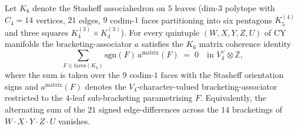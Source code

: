 \begin{theorem}
\label{thm:k6-5fold-matrix-coherence}
Let $K_6$ denote the Stasheff associahedron on $5$ leaves
\textup{(}dim-$3$ polytope with $C_4 = 14$ vertices, $21$ edges, $9$
codim-$1$ faces partitioning into six pentagons $K_5^{(4)}$ and three
squares $K_4^{(3)} \times K_4^{(3)}$\textup{).} For every quintuple
$(W, X, Y, Z, U)$ of CY manifolds the bracketing-associator $a$
satisfies the $K_6$ matrix coherence identity
\[
 \boxed{\;
 \sum_{F \in \mathrm{faces}(K_6)} \mathrm{sgn}(F)\,
 a^{\mathrm{matrix}}(F)
 \;=\; 0 \quad \text{in } V_4^\vee \otimes \mathbb{Z},
 \;}
\]
where the sum is taken over the $9$ codim-$1$ faces with the Stasheff
orientation signs and $a^{\mathrm{matrix}}(F)$ denotes the
$V_4$-character-valued bracketing-associator restricted to the
$4$-leaf sub-bracketing parametrising $F$. Equivalently, the alternating
sum of the $21$ signed edge-differences across the $14$ bracketings of
$W \cdot X \cdot Y \cdot Z \cdot U$ vanishes.
\end{theorem}

